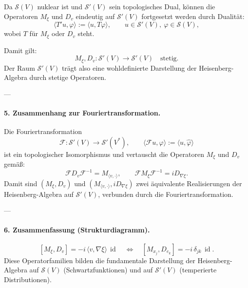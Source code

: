 \documentclass[10pt, letterpaper]{article}
\newcommand{\id}{\operatorname{id}}
\begin{document}
Da $\mathcal{S}(V)$ nuklear ist und $\mathcal{S}'(V)$ sein topologisches Dual,
können die Operatoren $M_\xi$ und $D_v$ eindeutig auf $\mathcal{S}'(V)$ fortgesetzt werden
durch Dualität:
\[
\langle T'u,\varphi\rangle:=\langle u,T\varphi\rangle,
\qquad
u\in\mathcal{S}'(V),\ \varphi\in\mathcal{S}(V),
\]
wobei $T$ für $M_\xi$ oder $D_v$ steht.

Damit gilt:
\[
M_\xi, D_v:\mathcal{S}'(V)\to\mathcal{S}'(V)\quad\text{stetig.}
\]
Der Raum $\mathcal{S}'(V)$ trägt also eine wohldefinierte Darstellung
der Heisenberg-Algebra durch stetige Operatoren.

---

\paragraph{5. Zusammenhang zur Fouriertransformation.}

Die Fouriertransformation
\[
\mathcal{F}:\mathcal{S}'(V)\to\mathcal{S}'(V^\ast),
\qquad
\langle \mathcal{F}u,\varphi\rangle:=\langle u,\hat{\varphi}\rangle
\]
ist ein topologischer Isomorphismus und vertauscht die Operatoren
$M_\xi$ und $D_v$ gemäß:
\[
\mathcal{F} D_v \mathcal{F}^{-1}=M_{\langle v,\cdot\rangle},\qquad
\mathcal{F} M_\xi \mathcal{F}^{-1}=i D_{\nabla\xi}.
\]
Damit sind $(M_\xi,D_v)$ und $(M_{\langle v,\cdot\rangle},i D_{\nabla\xi})$
zwei äquivalente Realisierungen der Heisenberg-Algebra auf $\mathcal{S}'(V)$,
verbunden durch die Fouriertransformation.

---

\paragraph{6. Zusammenfassung (Strukturdiagramm).}

\begin{center}
\end{center}
\[
\boxed{
[M_\xi,D_v]=-i\,\langle v,\nabla\xi\rangle\,\id
\quad\Longleftrightarrow\quad
[M_{x_j},D_{e_k}]=-i\,\delta_{jk}\,\id.
}
\]
Diese Operatorfamilien bilden die fundamentale Darstellung der Heisenberg-Algebra auf
$\mathcal{S}(V)$ (Schwartzfunktionen) und auf $\mathcal{S}'(V)$ (temperierte Distributionen).
\end{document}
